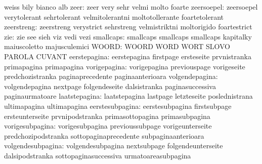                            weiss                     bily
                           bianco                    alb
                     zeer: zeer                      very
                           sehr                      velmi
                           molto                     foarte
               zeersoepel: zeersoepel                verytolerant
                           sehrtolerant              velmitolerantni
                           moltotollerante           foartetolerant
               zeerstreng: zeerstreng                verystrict
                           sehrstreng                velmistriktni
                           moltorigido               foartestrict %
                      zie: zie                       see
                           sieh                      viz
                           vedi                      vezi
                smallcaps: smallcaps                 smallcaps
                           smallcaps                 kapitalky
                           maiuscoletto              majusculemici
                    WOORD: WOORD                     WORD
                           WORT                      SLOVO
                           PAROLA                    CUVANT
             eerstepagina: eerstepagina              firstpage
                           ersteseite                prvnistranka
                           primapagina               primapagina
             vorigepagina: vorigepagina              previouspage
                           vorigeseite               predchozistranka
                           paginaprecedente          paginaanterioara
           volgendepagina: volgendepagina            nextpage
                           folgendeseite             dalsistranka
                           paginasuccessiva          paginaurmatoare
            laatstepagina: laatstepagina             lastpage
                           letzteseite               poslednistrana
                           ultimapagina              ultimapagina
          eerstesubpagina: eerstesubpagina           firstsubpage
                           ersteunterseite           prvnipodstranka
                           primasottopagina          primasubpagina
          vorigesubpagina: vorigesubpagina           previoussubpage
                           vorigeunterseite          predchozipodstranka
                           sottopaginaprecedente     subpaginaanterioara
        volgendesubpagina: volgendesubpagina         nextsubpage
                           folgendeunterseite        dalsipodstranka
                           sottopaginasuccessiva     urmatoareasubpagina
